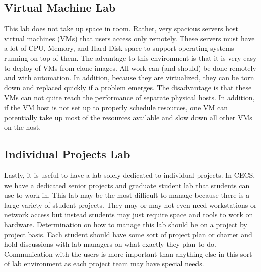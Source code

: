 \subsection{Virtual Machine Lab}
This lab does not take up space in room.  Rather, very spacious servers host virtual machines (VMs) that users access only remotely.  These servers must have a lot of CPU, Memory, and Hard Disk space to support operating systems running on top of them.  The advantage to this environment is that it is very easy to deploy of VMs from clone images.  All work can (and should) be done remotely and with automation.  In addition, because they are virtualized, they can be torn down and replaced quickly if a problem emerges.  The disadvantage is that these VMs can not quite reach the performance of separate physical hosts.  In addition, if the VM host is not set up to properly schedule resources, one VM can potentially take up most of the resources available and slow down all other VMs on the host.  
\subsection{Individual Projects Lab}
Lastly, it is useful to have a lab solely dedicated to individual projects.  In CECS, we have a dedicated senior projects and graduate student lab that students can use to work in.  This lab may be the most difficult to manage because there is a large variety of student projects.  They may or may not even need workstations or network access but instead students may just require space and tools to work on hardware.  Determination on how to manage this lab should be on a project by project basis.  Each student should have some sort of project plan or charter and hold discussions with lab managers on what exactly they plan to do.  Communication with the users is more important than anything else in this sort of lab environment as each project team may have special needs.  
